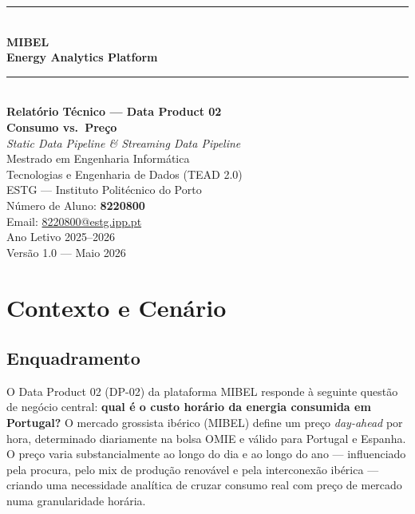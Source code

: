 \documentclass[11pt,a4paper]{article}
\begin{document}

\begin{titlepage}
  \centering
  \vspace*{2cm}
  {\color{mibel-blue}\rule{\linewidth}{1.5pt}}\\[0.4cm]
  {\Huge\bfseries\color{mibel-blue} MIBEL\\[0.3cm]
   \Large Energy Analytics Platform}\\[0.3cm]
  {\color{mibel-blue}\rule{\linewidth}{1.5pt}}\\[1.2cm]
  {\large\textbf{Relatório Técnico — Data Product 02}}\\[0.4cm]
  {\LARGE\bfseries\color{mibel-accent} Consumo vs.\ Preço}\\[0.4cm]
  {\large\textit{Static Data Pipeline \& Streaming Data Pipeline}}\\[1cm]
  {\large Mestrado em Engenharia Informática}\\
  {\large Tecnologias e Engenharia de Dados (TEAD 2.0)}\\[0.5cm]
  {\large ESTG --- Instituto Politécnico do Porto}\\[1.5cm]
  {\large Número de Aluno: \textbf{8220800}}\\[0.3cm]
  {\large Email: \href{mailto:8220800@estg.ipp.pt}{8220800@estg.ipp.pt}}\\[2cm]
  {\large Ano Letivo 2025--2026}\\[1cm]
  \vfill
  {\small Versão 1.0 --- Maio 2026}
\end{titlepage}

\tableofcontents
\newpage

\section{Contexto e Cenário}

\subsection{Enquadramento}

O Data Product 02 (DP-02) da plataforma MIBEL responde à seguinte questão de negócio central: \textbf{qual é o custo horário da energia consumida em Portugal?} O mercado grossista ibérico (MIBEL) define um preço \textit{day-ahead} por hora, determinado diariamente na bolsa OMIE e válido para Portugal e Espanha. O preço varia substancialmente ao longo do dia e ao longo do ano — influenciado pela procura, pelo mix de produção renovável e pela interconexão ibérica — criando uma necessidade analítica de cruzar consumo real com preço de mercado numa granularidade horária.
\end{document}
